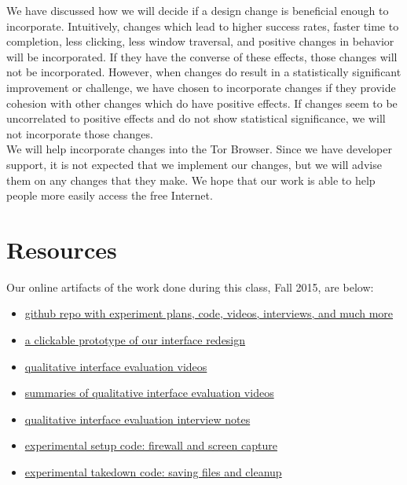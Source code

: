 \documentclass{template}
\begin{document}
 We have discussed how we will decide if a design change is beneficial enough to incorporate. Intuitively, changes which lead to higher success rates, faster time to completion, less clicking, less window traversal, and positive changes in behavior will be incorporated. If they have the converse of these effects, those changes will not be incorporated. However, when changes do result in a statistically significant improvement or challenge, we have chosen to incorporate changes if they provide cohesion with other changes which do have positive effects. If changes seem to be uncorrelated to positive effects and do not show statistical significance, we will not incorporate those changes. \\

 We will help incorporate changes into the Tor Browser. Since we have developer support, it is not expected that we implement our changes, but we will advise them on any changes that they make. We hope that our work is able to help people more easily access the free Internet. 

\section{Resources}
\noindent Our online artifacts of the work done during this class, Fall 2015,
are below: 
\begin{itemize} \itemsep1pt \parskip0pt 
\item \href{https://github.com/lindanlee/circumvention-ux-tor}{github repo with experiment plans, code, videos, interviews, and much more}
\item \href{https://marvelapp.com/15a2294}{a clickable prototype of our interface redesign}
\item \href{https://github.com/lindanlee/circumvention-ux-tor/tree/master/sessions/pre/videos}{qualitative interface evaluation videos}
\item \href{https://github.com/lindanlee/circumvention-ux-tor/blob/master/sessions/pre/participant-summaries.txt}{summaries of qualitative interface evaluation videos}
\item \href{https://github.com/lindanlee/circumvention-ux-tor/tree/master/sessions/pre/notes}{qualitative interface evaluation interview notes}
\item \href{https://github.com/lindanlee/circumvention-ux-tor/blob/master/setup/setup-environment}{experimental setup code: firewall and screen capture} 
\item \href{https://github.com/lindanlee/circumvention-ux-tor/blob/master/setup/takedown-environment}{experimental takedown code: saving files and cleanup} 
\end{itemize}
\end{document}

